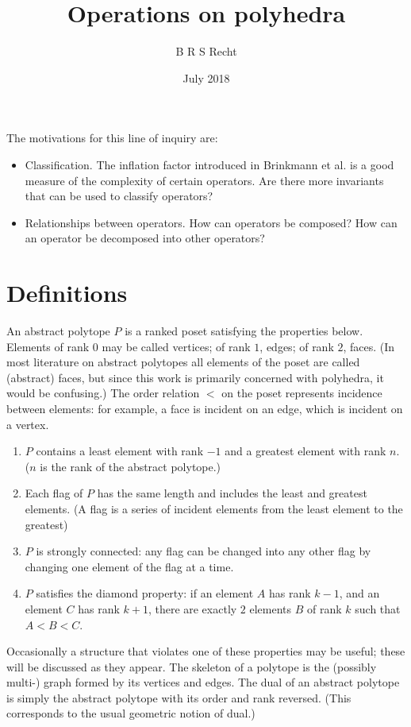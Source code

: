 \documentclass{amsart}[12pt]
\title{Operations on polyhedra}
\author{B R S Recht}
\date{July 2018}
\begin{document}
\maketitle

The motivations for this line of inquiry are:
\begin{itemize}
  \item Classification. The inflation factor introduced in Brinkmann et
  al. \cite{brinkmann} is a good measure of the complexity of certain operators.
  Are there more invariants that can be used to classify operators?
  \item Relationships between operators. How can operators be composed? How can
  an operator be decomposed into other operators?
\end{itemize}

\section{Definitions}

An abstract polytope $P$ is a ranked poset satisfying the properties below.
Elements of rank $0$ may be called vertices; of rank $1$, edges; of rank $2$,
faces. (In most literature on abstract polytopes all elements of the poset are
called (abstract) faces, but since this work is primarily concerned with
polyhedra, it would be confusing.) The order relation $<$ on the poset
represents incidence between elements: for example, a face is incident on an
edge, which is incident on a vertex. \cite{arp}
\begin{enumerate}
  \item $P$ contains a least element with rank $-1$ and a greatest
  element with rank $n$. ($n$ is the rank of the abstract polytope.)
  \item Each flag of $P$ has the same length and includes the least and greatest
  elements. (A flag is a series of incident elements from the least element to
  the greatest)
  \item $P$ is strongly connected: any flag can be changed into any other flag
  by changing one element of the flag at a time.
  \item $P$ satisfies the diamond property: if an element $A$ has rank $k-1$,
  and an element $C$ has rank $k+1$, there are exactly $2$ elements $B$ of
  rank $k$ such that $A < B < C$.
\end{enumerate}
Occasionally a structure that violates one of these properties may be useful;
these will be discussed as they appear. The skeleton of a polytope is the
(possibly multi-) graph formed by its vertices and edges.
The dual of an abstract polytope is simply the abstract polytope with its order
and rank reversed. (This corresponds to the usual geometric notion of dual.)
\end{document}
